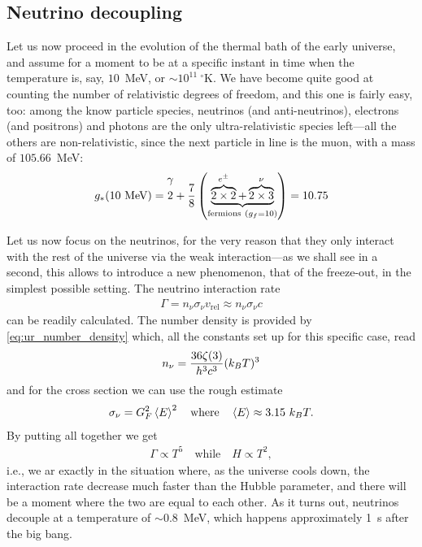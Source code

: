 \subsection{Neutrino decoupling}

Let us now proceed in the evolution of the thermal bath of the early universe, and
assume for a moment to be at a specific instant in time when the temperature is,
say, $10$~MeV, or $\sim 10^{11}~^\circ$K.
We have become quite good at counting the number of relativistic degrees of freedom,
and this one is fairly easy, too: among the know particle species, neutrinos (and
anti-neutrinos), electrons (and positrons) and photons are the only ultra-relativistic
species left---all the others are non-relativistic, since the next particle in line
is the muon, with a mass of $105.66$~MeV:
\begin{align*}
  \geff(10~\text{MeV}) = \overset{\raisebox{6pt}{$\gamma$}}{2} +
    \frac{7}{8} \left(\underbrace{\overbrace{2 \times 2}^{e^\pm} +
      \overbrace{2 \times 3}^{\nu}}_{\text{fermions}~(g_f = 10)}
    \right) = 10.75
\end{align*}

Let us now focus on the neutrinos, for the very reason that they only interact with
the rest of the universe via the weak interaction---as we shall see in a second,
this allows to introduce a new phenomenon, that of the freeze-out, in the simplest
possible setting. The neutrino interaction rate
\begin{align*}
  \Gamma = n_\nu \sigma_\nu v_\text{rel} \approx n_\nu \sigma_\nu c
\end{align*}
can be readily calculated. The number density is provided by \eqref{eq:ur_number_density}
which, all the constants set up for this specific case, read
\begin{align*}
  n_\nu = \frac{36 \zeta(3)}{h^3 c^3} (k_B T)^3
\end{align*}
and for the cross section we can use the rough estimate
\begin{align*}
  \sigma_\nu = G_F^2 \ave{E}^2
  \quad \text{where} \quad
  \ave{E}%
  \approx 3.15~\kT.
\end{align*}
By putting all together we get
\begin{align*}
  \Gamma \propto T^5
  \quad \text{while} \quad
  H \propto T^2,
\end{align*}
i.e., we ar exactly in the situation where, as the universe cools down, the interaction
rate decrease much faster than the Hubble parameter, and there will be a moment
where the two are equal to each other.
As it turns out, neutrinos decouple at a temperature of $\sim 0.8$~MeV, which
happens approximately 1~s after the big bang.

